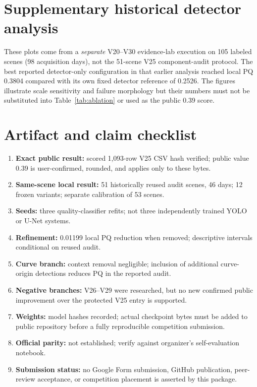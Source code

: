 \documentclass[11pt,a4paper]{article}
\begin{document}
\section{Supplementary historical detector analysis}
These plots come from a \emph{separate} V20--V30 evidence-lab execution on 105 labeled scenes (98 acquisition days), not the 51-scene V25 component-audit protocol. The best reported detector-only configuration in that earlier analysis reached local PQ 0.3804 compared with its own fixed detector reference of 0.2526. The figures illustrate scale sensitivity and failure morphology but their numbers must not be substituted into Table~\ref{tab:ablation} or used as the public 0.39 score.

\section{Artifact and claim checklist}
\begin{enumerate}[leftmargin=*]
\item \textbf{Exact public result:} scored 1,093-row V25 CSV hash verified; public value 0.39 is user-confirmed, rounded, and applies only to these bytes.
\item \textbf{Same-scene local result:} 51 historically reused audit scenes, 46 days; 12 frozen variants; separate calibration of 53 scenes.
\item \textbf{Seeds:} three quality-classifier refits; not three independently trained YOLO or U-Net systems.
\item \textbf{Refinement:} 0.01199 local PQ reduction when removed; descriptive intervals conditional on reused audit.
\item \textbf{Curve branch:} context removal negligible; inclusion of additional curve-origin detections reduces PQ in the reported audit.
\item \textbf{Negative branches:} V26--V29 were researched, but no new confirmed public improvement over the protected V25 entry is supported.
\item \textbf{Weights:} model hashes recorded; actual checkpoint bytes must be added to public repository before a fully reproducible competition submission.
\item \textbf{Official parity:} not established; verify against organizer's self-evaluation notebook.
\item \textbf{Submission status:} no Google Form submission, GitHub publication, peer-review acceptance, or competition placement is asserted by this package.
\end{enumerate}
\end{document}
